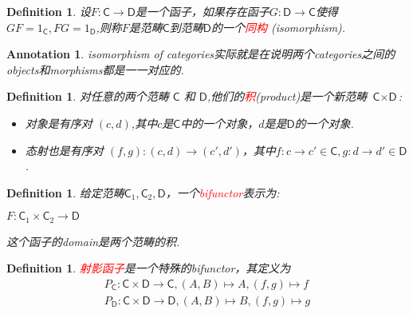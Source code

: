 \documentclass{article}
\newtheorem{definition}[theorem]{Definition}
\newtheorem{annotation}[theorem]{Annotation}
\newcommand*{\cat}[1]{\textsf{#1}\xspace}
\newcommand{\redt}[1]{\textcolor{red}{#1}}
\begin{document}
\begin{definition}
\rm 设$F \colon \cat{C} \rightarrow \cat{D}$是一个函子，如果存在函子$G \colon \cat{D} \rightarrow \cat{C}$使得$GF=1_{\cat{C}},FG = 1_{\cat{D}}$,则称$F$是范畴$\cat{C}$到范畴$\cat{D}$的一个\redt{同构} (isomorphism).
\end{definition}

\begin{annotation}
\rm  isomorphism of categories实际就是在说明两个categories之间的objects和morphisms都是一一对应的. 
\end{annotation}


\begin{definition}
\rm 对任意的两个范畴 $\cat{C}$ 和 $\cat{D}$,他们的\redt{积}(product)是一个新范畴 $\cat{C} \times \cat{D}$:
\begin{itemize}
	\item 对象是有序对 $\left(c,d \right)$,其中$c$是$\cat{C}$中的一个对象，$d$是是$\cat{D}$的一个对象.
	\item 态射也是有序对 $\left(f,g \right) \colon \left(c,d\right) \rightarrow \left(c',d'\right)$，其中$f\colon c \rightarrow c' \in \cat{C}, g \colon d \rightarrow d' \in \cat{D}$.
\end{itemize}
\end{definition}

\begin{definition}
\rm 给定范畴$\cat{C}_1,\cat{C}_2,\cat{D}$，一个\redt{bifunctor}表示为:
\begin{center}
$F \colon \cat{C}_1 \times \cat{C}_2 \rightarrow \cat{D}$
\end{center}
这个函子的domain是两个范畴的积. 
\end{definition}


\begin{definition}
\rm \redt{射影函子}是一个特殊的bifunctor，其定义为
$$
\begin{aligned}
P_{\cat{C}} \colon \cat{C} \times \cat{D} \rightarrow \cat{C},\left( A,B \right)\mapsto A,\left( f,g \right)\mapsto f \\
P_{\cat{D}} \colon \cat{C} \times \cat{D} \rightarrow \cat{D},\left( A,B \right)\mapsto B,\left( f,g \right)\mapsto g
\end{aligned}
$$
\end{definition}
\end{document}
